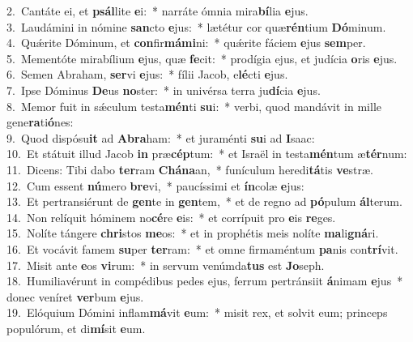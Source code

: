 {2.~}Cantáte ei, et \textbf{psál}lite \textbf{e}i:~* narráte ómnia mira\textbf{bí}lia \textbf{e}jus.\\
{3.~}Laudámini in nómine \textbf{san}cto \textbf{e}jus:~* lætétur cor quæ\textbf{rén}tium \textbf{Dó}minum.\\
{4.~}Quǽrite Dóminum, et \textbf{con}fir\textbf{má}\textbf{mi}ni:~* quǽrite fáciem \textbf{e}jus \textbf{sem}per.\\
{5.~}Mementóte mirabílium \textbf{e}jus, quæ \textbf{fe}cit:~* prodígia ejus, et judícia \textbf{o}ris \textbf{e}jus.\\
{6.~}Semen Abraham, \textbf{ser}vi \textbf{e}jus:~* fílii Jacob, e\textbf{lé}cti \textbf{e}jus.\\
{7.~}Ipse Dóminus \textbf{De}us \textbf{no}ster:~* in univérsa terra ju\textbf{dí}cia \textbf{e}jus.\\
{8.~}Memor fuit in sǽculum testa\textbf{mén}ti \textbf{su}i:~* verbi, quod mandávit in mille gene\textbf{ra}ti\textbf{ó}nes:\\
{9.~}Quod dispósu\textbf{it} ad \textbf{A}\textbf{bra}ham:~* et juraménti \textbf{su}i ad \textbf{I}saac:\\
{10.~}Et státuit illud Jacob \textbf{in} præ\textbf{cép}tum:~* et Israël in testa\textbf{mén}tum æ\textbf{tér}num:\\
{11.~}Dicens: Tibi dabo \textbf{ter}ram \textbf{Chá}\textbf{na}an,~* funículum heredi\textbf{tá}tis \textbf{ve}stræ.\\
{12.~}Cum essent \textbf{nú}mero \textbf{bre}vi,~* paucíssimi et \textbf{ín}colæ \textbf{e}jus:\\
{13.~}Et pertransiérunt de \textbf{gen}te in \textbf{gen}tem,~* et de regno ad \textbf{pó}pulum \textbf{ál}terum.\\
{14.~}Non relíquit hóminem no\textbf{cé}re \textbf{e}is:~* et corrípuit pro \textbf{e}is \textbf{re}ges.\\
{15.~}Nolíte tángere \textbf{chri}stos \textbf{me}os:~* et in prophétis meis nolíte \textbf{ma}li\textbf{gná}ri.\\
{16.~}Et vocávit famem \textbf{su}per \textbf{ter}ram:~* et omne firmaméntum \textbf{pa}nis con\textbf{trí}vit.\\
{17.~}Misit ante \textbf{e}os \textbf{vi}rum:~* in servum venúmda\textbf{tus} est \textbf{Jo}seph.\\
{18.~}Humiliavérunt in compédibus pedes ejus, ferrum pertránsiit \textbf{á}nimam \textbf{e}jus~* donec veníret \textbf{ver}bum \textbf{e}jus.\\
{19.~}Elóquium Dómini inflam\textbf{má}vit \textbf{e}um:~* misit rex, et solvit eum; princeps populórum, et di\textbf{mí}sit \textbf{e}um.\\

